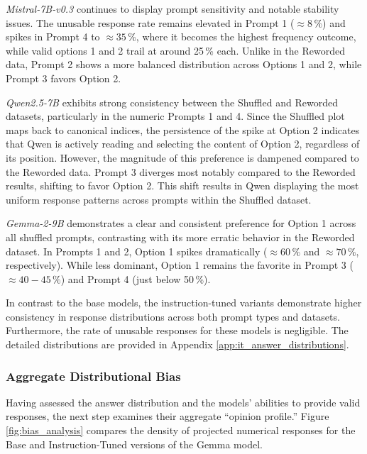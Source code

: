 \textit{Mistral-7B-v0.3} continues to display prompt sensitivity and notable stability issues. The unusable response rate remains elevated in Prompt 1 ($\approx 8\,\%$) and spikes in Prompt 4 to $\approx 35\,\%$, where it becomes the highest frequency outcome, while valid options 1 and 2 trail at around 25\,\% each. Unlike in the Reworded data, Prompt 2 shows a more balanced distribution across Options 1 and 2, while Prompt 3 favors Option 2.

\textit{Qwen2.5-7B} exhibits strong consistency between the Shuffled and Reworded datasets, particularly in the numeric Prompts 1 and 4. Since the Shuffled plot maps back to canonical indices, the persistence of the spike at Option 2 indicates that Qwen is actively reading and selecting the content of Option 2, regardless of its position. However, the magnitude of this preference is dampened compared to the Reworded data. Prompt 3 diverges most notably compared to the Reworded results, shifting to favor Option 2. This shift results in Qwen displaying the most uniform response patterns across prompts within the Shuffled dataset.

\textit{Gemma-2-9B} demonstrates a clear and consistent preference for Option 1 across all shuffled prompts, contrasting with its more erratic behavior in the Reworded dataset. In Prompts 1 and 2, Option 1 spikes dramatically ($\approx 60\,\%$ and $\approx 70\,\%$, respectively). While less dominant, Option 1 remains the favorite in Prompt 3 ($\approx 40-45\,\%$) and Prompt 4 (just below 50\,\%).

\vspace{0.2cm}
In contrast to the base models, the instruction-tuned variants demonstrate higher consistency in response distributions across both prompt types and datasets. Furthermore, the rate of unusable responses for these models is negligible. The detailed distributions are provided in Appendix \ref{app:it_answer_distributions}.


\subsubsection{Aggregate Distributional Bias}
\label{results:overview:answer_distr_on_scale}
Having assessed the answer distribution and the models' abilities to provide valid responses, the next step examines their aggregate ``opinion profile.'' Figure \ref{fig:bias_analysis} compares the density of projected numerical responses for the Base and Instruction-Tuned versions of the Gemma model.

